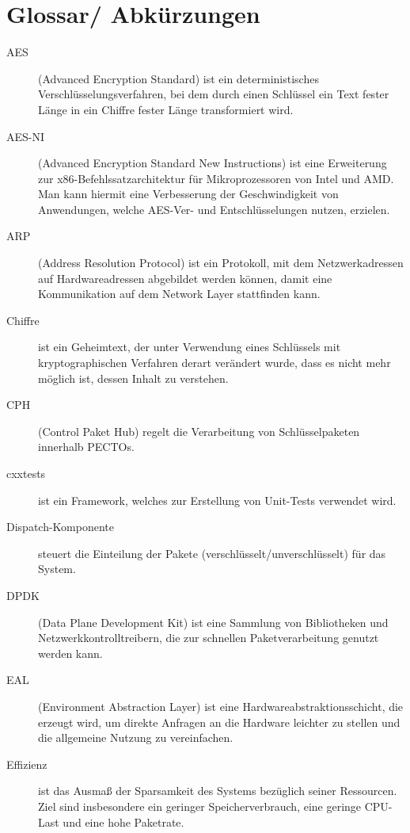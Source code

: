 \section{Glossar/ Abkürzungen}

\begin{description}
	\item[AES] (Advanced Encryption Standard) ist ein deterministisches Verschlüsselungsverfahren, bei dem durch einen Schlüssel ein Text fester Länge in ein Chiffre fester Länge transformiert wird. 
	
	\item[AES-NI] (Advanced Encryption Standard New Instructions) ist eine Erweiterung zur x86-Befehlssatzarchitektur für Mikroprozessoren von Intel und AMD. Man kann hiermit eine Verbesserung der Geschwindigkeit von Anwendungen, welche AES-Ver- und Entschlüsselungen nutzen, erzielen. 
	
	\item[ARP] (Address Resolution Protocol) ist ein Protokoll, mit dem Netzwerkadressen auf Hardwareadressen abgebildet werden können, damit eine Kommunikation auf dem Network Layer stattfinden kann.  
	
	\item[Chiffre] ist ein Geheimtext, der unter Verwendung eines Schlüssels mit kryptographischen Verfahren derart verändert wurde, dass es nicht mehr möglich ist, dessen Inhalt zu verstehen.
	
	\item[CPH] (Control Paket Hub) regelt die Verarbeitung von Schlüsselpaketen innerhalb PECTOs.
	
	\item[cxxtests] ist ein Framework, welches zur Erstellung von Unit-Tests verwendet wird.
	
	\item[Dispatch-Komponente] steuert die Einteilung der Pakete (verschlüsselt/unverschlüsselt) für das System.
	
	\item[DPDK] (Data Plane Development Kit) ist eine Sammlung von Bibliotheken und Netzwerkkontrolltreibern, die zur schnellen Paketverarbeitung genutzt werden kann.
	
	\item[EAL] (Environment Abstraction Layer) ist eine Hardwareabstraktionsschicht, die erzeugt wird, um direkte Anfragen an die Hardware leichter zu stellen und die allgemeine Nutzung zu vereinfachen.
		
	\item[Effizienz] ist das Ausmaß der Sparsamkeit des Systems bezüglich seiner Ressourcen. Ziel sind insbesondere ein geringer Speicherverbrauch, eine geringe CPU-Last und eine hohe Paketrate.
	

\end{description}
